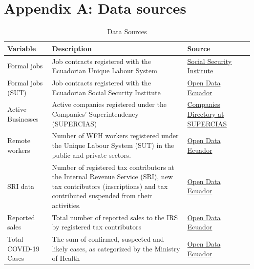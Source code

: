 \documentclass[11pt,a4paper]{article}\usepackage[]{graphicx}\usepackage[]{xcolor}
\begin{document}
\section*{Appendix A: Data sources}
\label{sec:appa}
\setcounter{table}{0} %
\renewcommand{\thetable}{A.\arabic{table}} %
\begin{table}[h]
\caption{Data Sources}
\vspace{0.1cm}
\label{tab:sources}
\begin{tabular}{lp{5cm}p{5cm}l@{}}
\toprule
\textbf{Variable}           & \textbf{Description}                                                                                        & \textbf{Source}                                       \\ \midrule
Formal jobs               & Job contracts registered with the Ecuadorian Unique Labour System                                      & \href{https://www.ecuadorencifras.gob.ec/registro-empleo-seguridad-social/}{Social Security Institute} \\
Formal jobs (SUT) & Job contracts registered with the Ecuadorian Social Security Institute                                      & \href{https://www.datosabiertos.gob.ec/}{Open Data Ecuador} \\
Active Businesses          & Active companies registered under the Companies' Superintendency   (SUPERCIAS)                              & \href{https://mercadodevalores.supercias.gob.ec/reportes/directorioCompanias.jsf}{Companies Directory at SUPERCIAS}                      \\
Remote workers              & Number of WFH workers registered under the Unique Labour System (SUT) in   the public and private sectors.  &\href{https://www.datosabiertos.gob.ec/}{Open Data Ecuador}                                     \\
SRI data & Number of registered tax contributors at the Internal Revenue Service (SRI), new tax contributors (inscriptions) and tax contributed suspended from their activities.                               & \href{https://www.datosabiertos.gob.ec/}{Open Data Ecuador}                                 \\
Reported sales              & Total number of reported sales to the IRS by registered tax contributors                                    & \href{https://www.datosabiertos.gob.ec/}{Open Data Ecuador}                                     \\
Total COVID-19   Cases & The sum of confirmed, suspected and likely   cases, as categorized by the Ministry of Health & \href{https://www.datosabiertos.gob.ec/}{Open Data Ecuador}    \\

\end{tabular}
\end{table}
\end{document}
